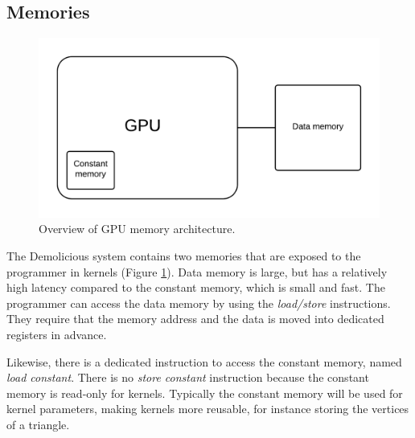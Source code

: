\subsection{Memories}

\begin{figure}[H]
	\centering
	\includegraphics[width=\textwidth]{system_overview/diagrams/memory_overview.png}
	\caption{Overview of GPU memory architecture.}
	\label{fig:memory_overview}
\end{figure}
The Demolicious system contains two memories that are exposed to the programmer in kernels (Figure \ref{fig:memory_overview}).
Data memory is large, but has a relatively high latency compared to the constant memory, which is small and fast.
The programmer can access the data memory by using the \textit{load/store} instructions.
They require that the memory address and the data is moved into dedicated registers in advance. 

Likewise, there is a dedicated instruction to access the constant memory, named \textit{load constant}.
There is no \textit{store constant} instruction because the constant memory is read-only for kernels.
Typically the constant memory will be used for kernel parameters, making kernels more reusable,
for instance storing the vertices of a triangle.

